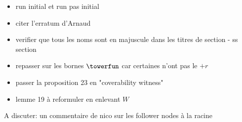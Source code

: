 \begin{itemize}
    \item run initial et run pas initial 
    \item citer l'erratum d'Arnaud
    \item verifier que tous les noms sont en majuscule dans les titres de section - ss section
    \item repasser sur les bornes $\towerfun$ car certaines n'ont pas le $+r$
    \item passer la proposition 23 en "coverability witness"
    \item lemme 19 à reformuler en enlevant $W$
\end{itemize}

A discuter: un commentaire de nico sur les follower nodes à la racine

